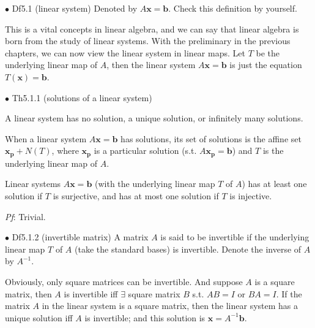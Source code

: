 \documentclass{article}
\begin{document}
\begin{Df}{$\bullet$ Df5.1 (linear system)}
    Denoted by $A\pmb{x} = \pmb{b}$. Check this definition by yourself.
\end{Df}

\begin{Rmk}{}
    This is a vital concepts in linear algebra, and we can say that linear algebra is born from the study of linear systems. With the preliminary in the previous chapters, we can now view the linear system in linear maps. Let $T$ be the underlying linear map of $A$, then the linear system $A\pmb{x} = \pmb{b}$ is just the equation $T(\pmb{x}) = \pmb{b}$. 
\end{Rmk}

\begin{Th}{$\bullet$ Th5.1.1 (solutions of a linear system)}
    \begin{compactenum}
        \item A linear system has no solution, a unique solution, or infinitely many solutions.
        \item When a linear system $A\pmb{x} = \pmb{b}$ has solutions, its set of solutions is the affine set $\pmb{x_p} + N(T)$, where $\pmb{x_p}$ is a particular solution (s.t. $A\pmb{x_p} = \pmb{b}$) and $T$ is the underlying linear map of $A$.
        \item Linear systems $A\pmb{x} = \pmb{b}$ (with the underlying linear map $T$ of $A$) has at least one solution if $T$ is surjective, and has at most one solution if $T$ is injective. 
    \end{compactenum}
    \tcblower
    \textit{Pf}: Trivial.
\end{Th}

\begin{Df}{$\bullet$ Df5.1.2 (invertible matrix)}
    A matrix $A$ is said to be invertible if the underlying linear map $T$ of $A$ (take the standard bases) is invertible. Denote the inverse of $A$ by $A^{-1}$.
\end{Df}

\begin{Rmk}{}
    Obviously, \textcolor{Th}{only square matrices can be invertible}. And \textcolor{Th}{suppose $A$ is a square matrix, then $A$ is invertible iff $\exists$ square matrix $B$ s.t. $AB = I$ or $BA = I$}. \textcolor{Th}{If the matrix $A$ in the linear system is a square matrix, then the linear system has a unique solution iff $A$ is invertible; and this solution is $\pmb{x} = A^{-1}\pmb{b}$.}
\end{Rmk}
\end{document}
